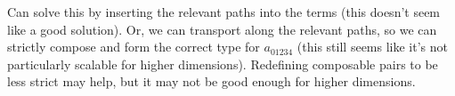 \documentclass{article}
\begin{document}
Can solve this by inserting the relevant paths into the terms (this doesn't seem like a good solution). Or, we can transport along the relevant paths, so we can strictly compose and form the correct type for $a_{01234}$ (this still seems like it's not particularly scalable for higher dimensions). Redefining composable pairs to be less strict may help, but it may not be good enough for higher dimensions.



\end{document}
